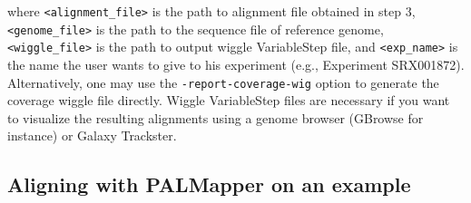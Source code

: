 \documentclass{article}
\begin{document}
\begin{enumerate}
where \texttt{<alignment\_file>} is the path to alignment file
obtained in step 3, \texttt{<genome\_file>} is the path to the
sequence file of reference genome, \texttt{<wiggle\_file>} is the path
to output wiggle VariableStep file, and \texttt{<exp\_name>} is the
name the user wants to give to his experiment (e.g., Experiment
SRX001872). Alternatively, one may use the
\texttt{-report-coverage-wig} option to generate the coverage wiggle
file directly. Wiggle VariableStep files are necessary if you want to
visualize the resulting alignments using a genome browser (GBrowse for
instance) or Galaxy Trackster.  
\end{enumerate}


\subsection{Aligning with PALMapper on an example}
\label{sec:example}
\end{document}
